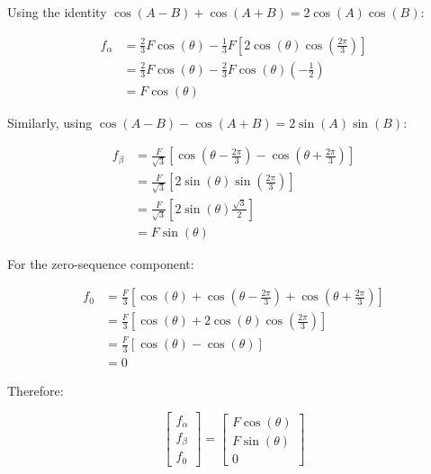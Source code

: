 \documentclass{article}
\begin{document}
Using the identity $\cos(A-B)+\cos(A+B)=2\cos(A)\cos(B)$:

\begin{align}
    f_{\alpha}
    &=
    \frac{2}{3}F\cos(\theta)
    -\frac{1}{3}F
    \left[
        2\cos(\theta)\cos\left(\frac{2\pi}{3}\right)
    \right] \\[2mm]
    &=
    \frac{2}{3}F\cos(\theta)
    -\frac{2}{3}F\cos(\theta)
    \left(-\frac{1}{2}\right) \\[2mm]
    &=
    F\cos(\theta)
\end{align}

Similarly, using $\cos(A-B)-\cos(A+B)=2\sin(A)\sin(B)$:

\begin{align}
    f_{\beta}
    &=
    \frac{F}{\sqrt{3}}
    \left[
        \cos\left(\theta-\frac{2\pi}{3}\right)
        -
        \cos\left(\theta+\frac{2\pi}{3}\right)
    \right] \\[2mm]
    &=
    \frac{F}{\sqrt{3}}
    \left[
        2\sin(\theta)\sin\left(\frac{2\pi}{3}\right)
    \right] \\[2mm]
    &=
    \frac{F}{\sqrt{3}}
    \left[
        2\sin(\theta)\frac{\sqrt{3}}{2}
    \right] \\[2mm]
    &=
    F\sin(\theta)
\end{align}

For the zero-sequence component:

\begin{align}
    f_0
    &=
    \frac{F}{3}
    \left[
        \cos(\theta)
        +
        \cos\left(\theta-\frac{2\pi}{3}\right)
        +
        \cos\left(\theta+\frac{2\pi}{3}\right)
    \right] \\[2mm]
    &=
    \frac{F}{3}
    \left[
        \cos(\theta)
        +
        2\cos(\theta)\cos\left(\frac{2\pi}{3}\right)
    \right] \\[2mm]
    &=
    \frac{F}{3}
    \left[
        \cos(\theta)-\cos(\theta)
    \right] \\[2mm]
    &=0
\end{align}

Therefore:

\begin{equation}
\label{alpha-beta-0-3p-result}
    \begin{bmatrix}
        f_{\alpha} \\
        f_{\beta} \\
        f_0
    \end{bmatrix}
    =
    \begin{bmatrix}
        F\cos(\theta) \\
        F\sin(\theta) \\
        0
    \end{bmatrix}
\end{equation}
\end{document}
